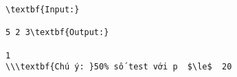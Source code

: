 \begin{verbatim}
\textbf{Input:}

5 2 3\textbf{Output:}

1
\\\textbf{Chú ý: }50% số test với p  $\le$  20
\end{verbatim}